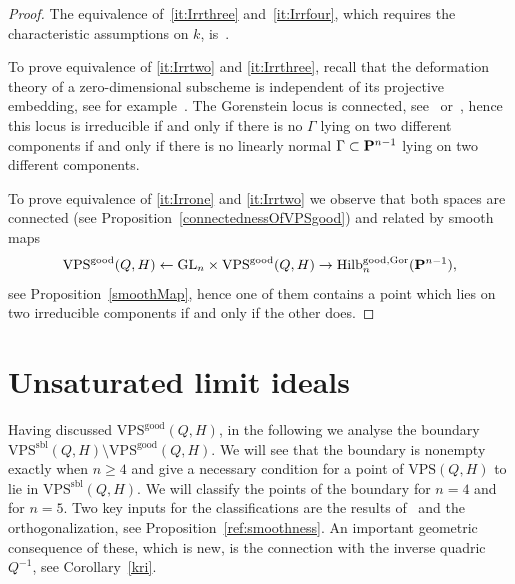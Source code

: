 \documentclass{amsart}
\newcommand{\Hilb}{{\rm{Hilb}}}
\newcommand{\PP}{{\bf P}}
\newcommand{\HgoodGor}{\Hilb^{\rm{good}, \rm{Gor}}_{n}(\PP^{n-1})}
\newcommand{\VPSsbl}{{\mathrm{VPS}}^{\mathrm{sbl}}(Q, H)}
\newcommand{\VPSgood}{{\mathrm{VPS}}^{\mathrm{good}}(Q, H)}
\newcommand{\VPS}{\mathrm{VPS}(Q, H)}
\newcommand{\GL}{\mathrm{GL}}%
\begin{document}
\begin{proof}
    The equivalence of~\ref{it:Irrthree} and~\ref{it:Irrfour}, which requires
    the characteristic assumptions on $k$, is~\cite[Theorem~A]{cjn13}.

    To prove equivalence of \ref{it:Irrtwo} and \ref{it:Irrthree}, recall that
    the deformation theory of a zero-dimensional
    subscheme is independent of its projective embedding, see for
    example~\cite[p.4]{artin_deform_of_sings}. The
    Gorenstein locus is connected,
    see~\cite[Proposition~4.1]{hoyois2021hermitian}
    or~\cite{casnati_notari_irreducibility_Gorenstein_degree_9}, hence this
    locus is irreducible if and only if there is no $\Gamma$ lying on two different
    components if and only if there is no linearly normal $\Gamma \subset \PP^{n-1}$
    lying on two different components.

    To prove equivalence of \ref{it:Irrone} and \ref{it:Irrtwo} we observe
    that both spaces are connected (see
    Proposition~\ref{connectednessOfVPSgood}) and related by smooth maps
    \[
        \VPSgood \leftarrow \GL_n \times \VPSgood \to \HgoodGor,
    \]
    see Proposition~\ref{smoothMap}, hence one of them contains a point which
    lies on two irreducible components if and only if the other does.
\end{proof}

\section{Unsaturated limit ideals}\label{section:unsat}

Having discussed $\VPSgood$,
in the following we analyse the boundary $\VPSsbl \setminus \VPSgood$. We will
see that the boundary is nonempty exactly
when $n\geq 4$ and give a necessary condition for a point of $\VPS$ to lie in
$\VPSsbl$. We will classify the points of the boundary for $n=4$ and for $n=5$. Two key inputs for the classifications are the results of~\cite{JM} and the orthogonalization, see Proposition~\ref{ref:smoothness}. An important geometric consequence of these, which is new, is the connection with the inverse quadric $Q^{-1}$, see Corollary~\ref{kri}.
\end{document}
